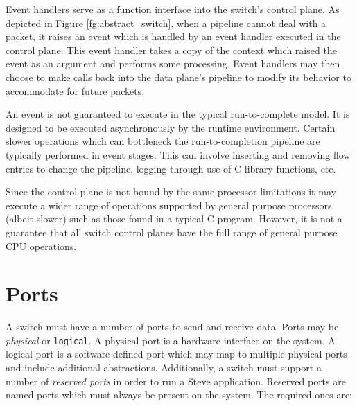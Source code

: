 Event handlers serve as a function interface into the switch's control plane.
As depicted in Figure \ref{fg:abstract_switch}, when a pipeline
cannot deal with a packet, it raises an event which is 
handled by an event handler executed in the control plane.
This event handler takes a copy of the context which raised the
event as an argument and performs some processing.
Event handlers may then choose to make calls back into the data plane's
pipeline to modify its behavior to accommodate for future packets.

An event is not guaranteed to execute in the typical run-to-complete model.
It is designed to be executed asynchronously by the runtime environment.
Certain slower operations which can
bottleneck the run-to-completion pipeline are typically performed in event
stages. This can involve inserting and removing flow entries to change the
pipeline, logging through use of C library functions, etc.

Since the control plane is not bound by the same processor limitations
it may execute a wider range of operations supported by general purpose processors (albeit slower) such as those found in a typical C program. However, it is not a guarantee that all switch control planes have the full range of general purpose CPU operations.

\section{Ports} \label{port_desc}

A switch must have a number of ports to send and receive data. Ports may be \emph{physical} or \texttt{logical}. A physical port is a hardware interface on the system. A logical port is a software defined port which may map to multiple physical ports and include additional abstractions.
Additionally, a switch must support a number of \emph{reserved ports} in order to run a Steve application. Reserved ports are named ports which must always be present on the system. The required ones are:


